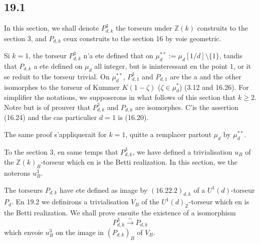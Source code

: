 \documentclass[12pt,a4paper]{article}
\theoremstyle{plain}
\theoremstyle{definition}
\theoremstyle{remark}
\newcommand{\Betti}{B}
\newcommand{\ZZ}{\mathbb{Z}}
\begin{document}
\subsection{19.1}

In this section, we shall denote $P^3_{d,k}$ the torseurs under
$\ZZ(k)$ construits to the section 3, and $P_{d,k}$ ceux construits to the
section 16 by voie geometric.

Si $k=1$, the torseur $P^3_{d,k}$ n'a ete defined that on
$\mu_d^{**} := \mu_d[1/d] \setminus \{1\}$, tandis that $P_{d,k}$ a
ete defined on $\mu_d$ all integer, but is ininteressant en the point
$1$, or it se reduit to the torseur trivial. On $\mu_d^{**}$, $P^3_{d,1}$
and $P_{d,1}$ are the a and the other isomorphes to the torseur of Kummer
$K(1-\zeta)$ ($\zeta \in \mu_d^*$) (3.12 and 16.26). For simplifier the
notations, we supposerons in what follows of this section that
$k \geq 2$. Notre but is of prouver that $P^3_{d,k}$ and $P_{d,k}$
are isomorphes. C'is the assertion (16.24) and the cas particulier $d=1$
is (16.20).

The same proof s'appliquerait for $k=1$, quitte a remplacer partout
$\mu_d$ by $\mu_d^{**}$.

To the section 3, en same temps that $P^3_{d,k}$, we have defined a
trivialisation $u_\Betti$ of the $\ZZ(k)_\Betti$-torseur which en is the
Betti realization. In this section, we the noterons $u^3_\Betti$.

The torseurs $P_{d,k}$ have ete defined as image by
$(16.22.2)_{d,k}$ of a $U^1(d)$-torseur $P_d$. En 19.2 we
definirons a trivialisation $V_\Betti$ of the $U^1(d)_\ZZ$-torseur which
en is the Betti realization. We shall prove ensuite the existence
of a isomorphism
\begin{equation}\label{eq:19.1.1}
P^3_{d,k} \xrightarrow{\sim} P_{d,k}
\end{equation}
which envoie $u^3_\Betti$ on the image in $(P_{d,k})_\Betti$ of
$V_\Betti$.
\end{document}
